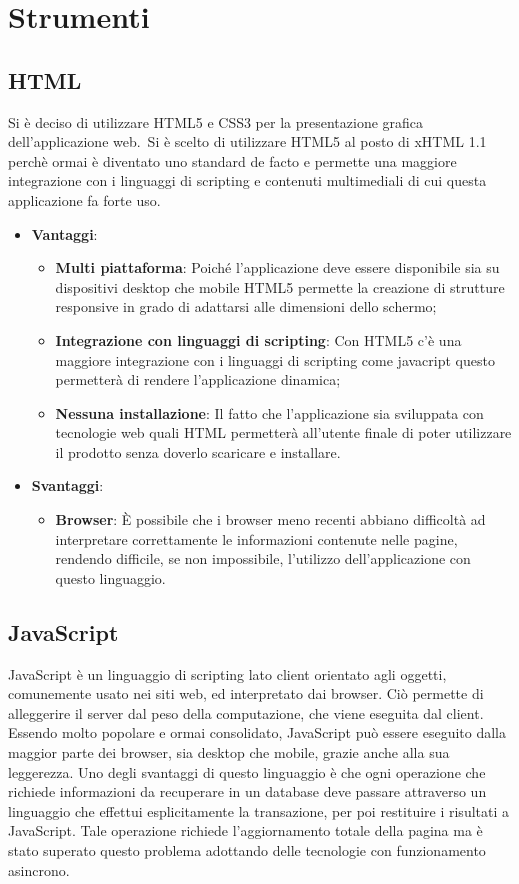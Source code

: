 \section{Strumenti}
	\subsection{HTML}{
		Si è deciso di utilizzare HTML5 e CSS3 per la presentazione grafica dell'applicazione web.\
		Si è scelto di utilizzare HTML5 al posto di xHTML 1.1 perchè ormai è diventato uno standard de facto e permette una maggiore integrazione con i linguaggi di scripting e contenuti multimediali
		di cui questa applicazione fa forte uso.
	
		\begin{itemize}
			\item \textbf{Vantaggi}: 
			\begin{itemize}
				\item \textbf{Multi piattaforma}: Poiché l'applicazione deve essere disponibile sia su dispositivi desktop che mobile HTML5 permette la creazione di strutture responsive in grado di adattarsi alle dimensioni dello schermo;
				\item \textbf{Integrazione con linguaggi di scripting}: Con HTML5 c'è una maggiore integrazione con i linguaggi di scripting come javacript questo permetterà di rendere l'applicazione dinamica;
				\item \textbf{Nessuna installazione}: Il fatto che l'applicazione sia sviluppata con tecnologie web quali HTML permetterà all'utente finale di poter utilizzare il prodotto senza doverlo scaricare e installare.
			\end{itemize}
			\item \textbf{Svantaggi}:
			\begin{itemize}
				\item \textbf{Browser}: È possibile che i browser meno recenti abbiano difficoltà ad interpretare correttamente le informazioni contenute nelle pagine, rendendo difficile, se non impossibile, l'utilizzo dell'applicazione con questo linguaggio.
			\end{itemize}
		\end{itemize}
		}
	\subsection{JavaScript}{
		JavaScript è un linguaggio di scripting lato client orientato agli oggetti, comunemente usato nei siti web, ed interpretato dai browser. Ciò permette di alleggerire il server dal peso della computazione, che viene eseguita dal client. Essendo molto popolare e ormai consolidato, JavaScript può essere eseguito dalla maggior parte dei browser, sia desktop che mobile, grazie anche alla sua leggerezza. Uno degli svantaggi di questo linguaggio è che ogni operazione che richiede informazioni da recuperare in un database deve passare attraverso un linguaggio che effettui esplicitamente la transazione, per poi restituire i risultati a JavaScript. Tale operazione richiede l’aggiornamento totale della pagina ma è stato superato questo problema adottando delle tecnologie con funzionamento asincrono.
		}
